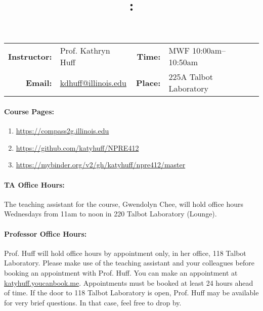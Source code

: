 \documentclass[11pt, a4paper]{article}
\title{\CourseNumber: \CourseTitle\\}
\author{\CourseUniversity}
\date{\CourseSemester \CourseYear}
\makeatletter
\newcommand{\CourseNumber}{NPRE412}
\newcommand{\CourseInstructor}{Prof. Kathryn Huff\xspace}%
\newcommand{\CourseDays}{MWF\xspace}%
\newcommand{\CourseStart}{10:00am\xspace}%
\newcommand{\CourseEnd}{10:50am\xspace}%
\newcommand{\CourseInstructorEmail}{kdhuff@illinois.edu}
\newcommand{\HuffOfficeHourPlace}{118 Talbot Laboratory\xspace}
\newcommand{\CourseRoom}{225A\xspace}%
\newcommand{\CourseBuilding}{Talbot Laboratory\xspace}%
\newcommand{\TeachingAssistant}{Gwendolyn Chee\xspace}%
\newcommand{\TAOfficeHourDays}{Wednesdays\xspace}%
\newcommand{\TAOfficeHourStart}{11am\xspace}%
\newcommand{\TAOfficeHourEnd}{noon\xspace}%
\newcommand{\TAOfficeHourPlace}{220 Talbot Laboratory (Lounge)\xspace}
\makeatother
\begin{document}
\maketitle
\renewcommand{\arraystretch}{1.5}
\begin{center}
\begin{table}[h]
\begin{tabularx}{\textwidth}{rXrX}
\hline
\textbf{Instructor:} & \CourseInstructor & \textbf{Time:} & \CourseDays \CourseStart -- \CourseEnd \\
\textbf{Email:} &  \href{mailto:\CourseInstructorEmail}{\CourseInstructorEmail} & \textbf{Place:} & \CourseRoom \CourseBuilding\\
\hline
\end{tabularx}
\end{table}
\end{center}

\paragraph{Course Pages:}
\begin{enumerate}
        \item \url{https://compass2g.illinois.edu}
        \item \url{https://github.com/katyhuff/\CourseNumber}
        \item \url{https://mybinder.org/v2/gh/katyhuff/npre412/master}
\end{enumerate}

\paragraph{TA Office Hours:} The teaching assistant for the course, 
\TeachingAssistant, will hold office hours \TAOfficeHourDays from 
\TAOfficeHourStart to \TAOfficeHourEnd in \TAOfficeHourPlace.



\paragraph{Professor Office Hours:} Prof. Huff will hold office hours by appointment
only, in her office, \HuffOfficeHourPlace. Please make use of the teaching
assistant and your colleagues before booking an appointment with Prof. Huff.
You can make an appointment at \url{katyhuff.youcanbook.me}. Appointments 
must be booked at least 24 hours ahead of time.
If the door to \HuffOfficeHourPlace is open, Prof. Huff may be available for very brief 
questions. In that case, feel free to drop by.
\end{document}
